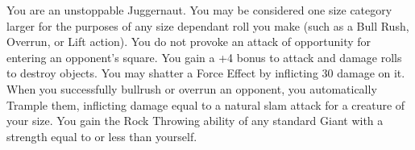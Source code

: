 {You are an unstoppable Juggernaut.}
{You may be considered one size category larger for the purposes of any size dependant roll you make (such as a Bull Rush, Overrun, or Lift action).}
{You do not provoke an attack of opportunity for entering an opponent's square.}
{You gain a +4 bonus to attack and damage rolls to destroy objects. You may shatter a Force Effect by inflicting 30 damage on it.}
{When you successfully bullrush or overrun an opponent, you automatically Trample them, inflicting damage equal to a natural slam attack for a creature of your size.}
{You gain the Rock Throwing ability of any standard Giant with a strength equal to or less than yourself.}